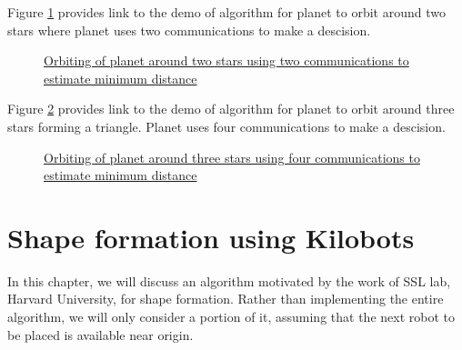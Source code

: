 \documentclass{report}[12pt]
\begin{document}
Figure \ref{fig:orbit_two_star} provides link to the demo of algorithm for planet to orbit around two stars where planet uses two communications to make a descision.
\begin{figure}[H]
	\centering
	\caption{\href{https://youtu.be/EKvty2OxXxM}{Orbiting of planet around two stars using two communications to estimate minimum distance}}
	\label{fig:orbit_two_star}
\end{figure}

Figure \ref{fig:orbit_three_stars} provides link to the demo of algorithm for planet to orbit around three stars forming a triangle. Planet uses four communications to make a descision.
\begin{figure}[H]
	\centering
	\caption{\href{https://youtu.be/5aZm0Os9BPc}{Orbiting of planet around three stars using four communications to estimate minimum distance}}
	\label{fig:orbit_three_stars}
\end{figure}

\chapter{Shape formation using Kilobots}
In this chapter, we will discuss an algorithm motivated by the work \cite{MR-AC-RN:2014} of SSL lab, Harvard University, for shape formation. Rather than implementing the entire algorithm, we will only consider a portion of it, assuming that the next robot to be placed is available near origin.
\end{document}

